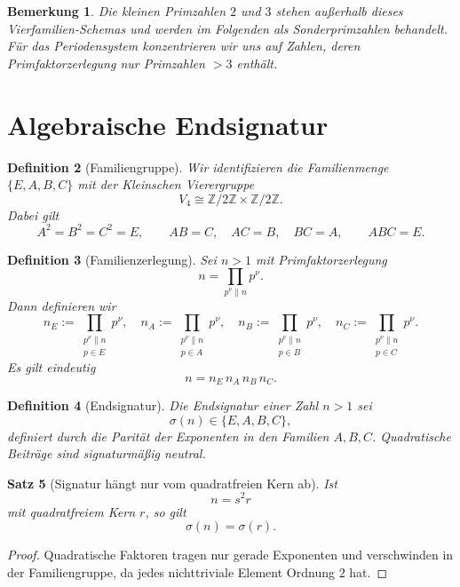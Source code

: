\documentclass[12pt,a4paper]{article}
\newtheorem{satz}{Satz}[section]
\newtheorem{definition}[satz]{Definition}
\newtheorem{bemerkung}[satz]{Bemerkung}
\newcommand{\Z}{\mathbb{Z}}
\newcommand{\sign}{\sigma}
\begin{document}
	\begin{bemerkung}
		Die kleinen Primzahlen $2$ und $3$ stehen außerhalb dieses Vierfamilien-Schemas und werden im Folgenden als \emph{Sonderprimzahlen} behandelt. Für das Periodensystem konzentrieren wir uns auf Zahlen, deren Primfaktorzerlegung nur Primzahlen $>3$ enthält.
	\end{bemerkung}
	
	\section{Algebraische Endsignatur}
	
	\begin{definition}[Familiengruppe]
		Wir identifizieren die Familienmenge $\{E,A,B,C\}$ mit der Kleinschen Vierergruppe
		\[
		V_4\cong \Z/2\Z\times \Z/2\Z.
		\]
		Dabei gilt
		\[
		A^2=B^2=C^2=E,
		\qquad
		AB=C,\quad AC=B,\quad BC=A,
		\qquad
		ABC=E.
		\]
	\end{definition}
	
	\begin{definition}[Familienzerlegung]
		Sei $n>1$ mit Primfaktorzerlegung
		\[
		n=\prod_{p^\nu\parallel n} p^\nu.
		\]
		Dann definieren wir
		\[
		n_E:=\prod_{\substack{p^\nu\parallel n\\ p\in E}} p^\nu,\quad
		n_A:=\prod_{\substack{p^\nu\parallel n\\ p\in A}} p^\nu,\quad
		n_B:=\prod_{\substack{p^\nu\parallel n\\ p\in B}} p^\nu,\quad
		n_C:=\prod_{\substack{p^\nu\parallel n\\ p\in C}} p^\nu.
		\]
		Es gilt eindeutig
		\[
		n=n_E\,n_A\,n_B\,n_C.
		\]
	\end{definition}
	
	\begin{definition}[Endsignatur]
		Die \emph{Endsignatur} einer Zahl $n>1$ sei
		\[
		\sign(n)\in\{E,A,B,C\},
		\]
		definiert durch die Parität der Exponenten in den Familien $A,B,C$. Quadratische Beiträge sind signaturmäßig neutral.
	\end{definition}
	
	\begin{satz}[Signatur hängt nur vom quadratfreien Kern ab]
		Ist
		\[
		n=s^2r
		\]
		mit quadratfreiem Kern $r$, so gilt
		\[
		\sign(n)=\sign(r).
		\]
	\end{satz}
	
	\begin{proof}
		Quadratische Faktoren tragen nur gerade Exponenten und verschwinden in der Familiengruppe, da jedes nichttriviale Element Ordnung $2$ hat.
	\end{proof}
	
\end{document}
